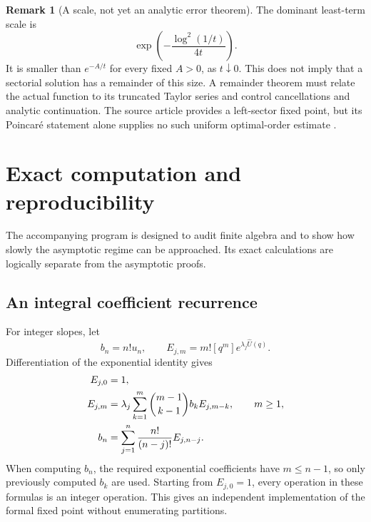 \documentclass[11pt,a4paper]{article}
\theoremstyle{definition}
\newtheorem{remark}[theorem]{Remark}
\newcommand{\U}{\widehat U}
\numberwithin{equation}{section}
\begin{document}
\begin{remark}[A scale, not yet an analytic error theorem]
The dominant least-term scale is
\begin{equation}
 \exp\!\left(-\frac{\log^2(1/t)}{4t}\right).
 \label{eq:superleast}
\end{equation}
It is smaller than \(e^{-A/t}\) for every fixed \(A>0\), as
\(t\downarrow0\). This does not imply that a sectorial solution has a
remainder of this size. A remainder theorem must relate the actual function
to its truncated Taylor series and control cancellations and analytic
continuation. The source article provides a left-sector fixed point, but
its Poincar\'e statement alone supplies no such uniform optimal-order
estimate \cite{repo-classification}.
\end{remark}

\section{Exact computation and reproducibility}
\label{sec:computation}
The accompanying program is designed to audit finite algebra and to show
how slowly the asymptotic regime can be approached. Its exact calculations
are logically separate from the asymptotic proofs.

\subsection{An integral coefficient recurrence}
For integer slopes, let
\begin{equation}
 b_n=n!u_n,\qquad E_{j,m}=m![q^m]e^{\lambda_j\U(q)}.
 \label{eq:scaled-recurrence-defs}
\end{equation}
Differentiation of the exponential identity gives
\begin{align}
 E_{j,0}&=1,\notag\\
 E_{j,m}&=\lambda_j\sum_{k=1}^m
            \binom{m-1}{k-1}b_kE_{j,m-k},\qquad m\ge1,
                                                   \label{eq:exact-rec-E}\\
 b_n&=\sum_{j=1}^n\frac{n!}{(n-j)!}E_{j,n-j}.
                                                   \label{eq:exact-rec-b}
\end{align}
When computing \(b_n\), the required exponential coefficients have
\(m\le n-1\), so only previously computed \(b_k\) are used. Starting
from \(E_{j,0}=1\), every operation in these formulas is an integer
operation. This gives an independent implementation of the formal fixed
point without enumerating partitions.
\end{document}
